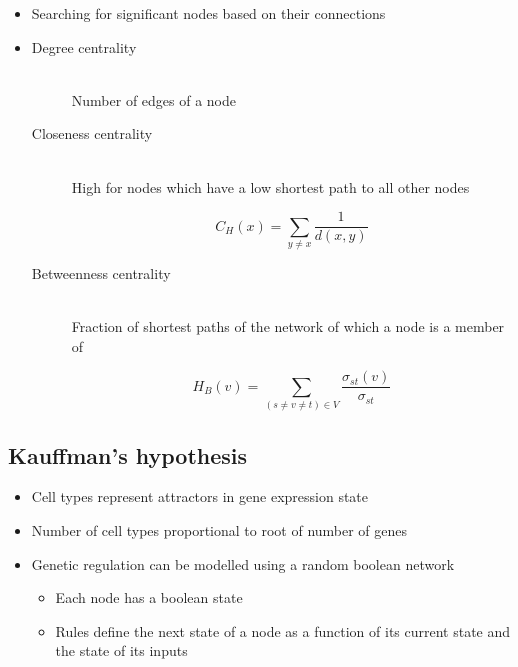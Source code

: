 \documentclass[a4paper]{article}
\begin{document}

\begin{itemize}
  \item
    Searching for significant nodes based on their connections

  \item
    \begin{description}
      \item[Degree centrality] \hfill \\
        Number of edges of a node

      \item[Closeness centrality] \hfill \\
        High for nodes which have a low shortest path to all other nodes

        \[
          C_{H}(x) = \sum_{y \neq x} \frac{1}{d(x, y)}
        \]

      \item[Betweenness centrality] \hfill \\
        Fraction of shortest paths of the network of which a node is a member of

        \[
          H_{B}(v) = \sum_{(s \neq v \neq t) \in V} \frac{\sigma_{st}(v)}{\sigma_{st}}
        \]

    \end{description}
\end{itemize}

\subsection{Kauffman's hypothesis}

\begin{itemize}
  \item
    Cell types represent attractors in gene expression state

  \item
    Number of cell types proportional to root of number of genes

  \item
    Genetic regulation can be modelled using a random boolean network

    \begin{itemize}
      \item
        Each node has a boolean state

      \item
        Rules define the next state of a node as a function of its current state
        and the state of its inputs
    \end{itemize}
\end{itemize}
\end{document}
